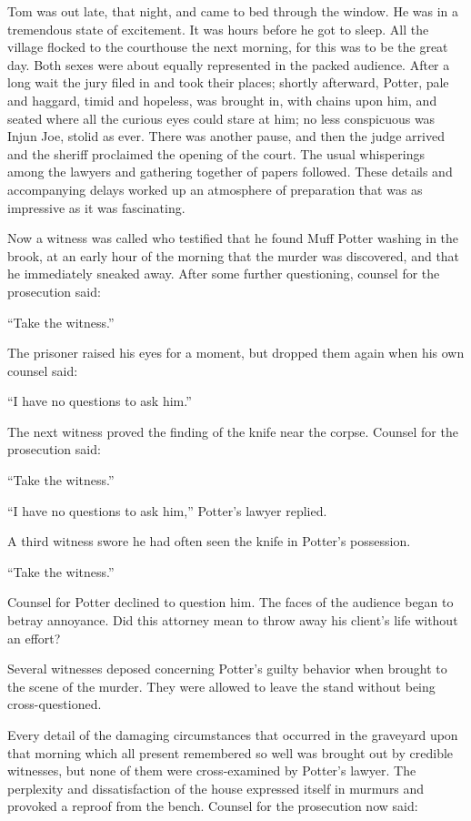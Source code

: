 \documentclass{book}
\begin{document}
Tom was out late, that night, and came to bed through the window. He was in a tremendous state of excitement. It was hours before he got to sleep. All the village flocked to the courthouse the next morning, for this was to be the great day. Both sexes were about equally represented in the packed audience. After a long wait the jury filed in and took their places; shortly afterward, Potter, pale and haggard, timid and hopeless, was brought in, with chains upon him, and seated where all the curious eyes could stare at him; no less conspicuous was Injun Joe, stolid as ever. There was another pause, and then the judge arrived and the sheriff proclaimed the opening of the court. The usual whisperings among the lawyers and gathering together of papers followed. These details and accompanying delays worked up an atmosphere of preparation that was as impressive as it was fascinating.

Now a witness was called who testified that he found Muff Potter washing in the brook, at an early hour of the morning that the murder was discovered, and that he immediately sneaked away. After some further questioning, counsel for the prosecution said:

“Take the witness.”

The prisoner raised his eyes for a moment, but dropped them again when his own counsel said:

“I have no questions to ask him.”

The next witness proved the finding of the knife near the corpse. Counsel for the prosecution said:

“Take the witness.”

“I have no questions to ask him,” Potter’s lawyer replied.

A third witness swore he had often seen the knife in Potter’s possession.

“Take the witness.”

Counsel for Potter declined to question him. The faces of the audience began to betray annoyance. Did this attorney mean to throw away his client’s life without an effort?

Several witnesses deposed concerning Potter’s guilty behavior when brought to the scene of the murder. They were allowed to leave the stand without being cross-questioned.

Every detail of the damaging circumstances that occurred in the graveyard upon that morning which all present remembered so well was brought out by credible witnesses, but none of them were cross-examined by Potter’s lawyer. The perplexity and dissatisfaction of the house expressed itself in murmurs and provoked a reproof from the bench. Counsel for the prosecution now said:
\end{document}
